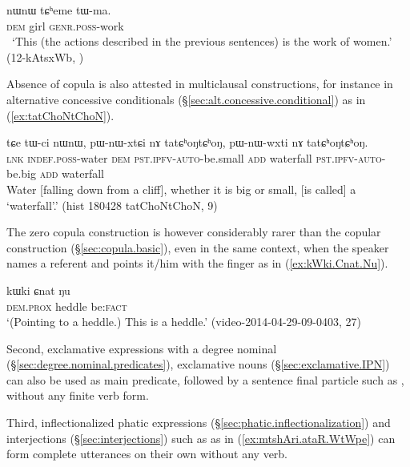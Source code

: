 \begin{exe}
\ex \label{ex:tCheme.tWma}
\gll nɯnɯ tɕʰeme tɯ-ma. \\
\textsc{dem} girl \textsc{genr}.\textsc{poss}-work \\
\glt  `This (the actions described in the previous sentences) is the work of women.' (12-kAtsxWb, )
\end{exe}

Absence of copula is also attested in multiclausal constructions, for instance in alternative concessive conditionals (§\ref{sec:alt.concessive.conditional}) as in (\ref{ex:tatChoNtChoN}).

\begin{exe}
	\ex \label{ex:tatChoNtChoN}
	\gll tɕe tɯ-ci nɯnɯ, pɯ-nɯ-xtɕi nɤ tatɕʰoŋtɕʰoŋ, pɯ-nɯ-wxti nɤ tatɕʰoŋtɕʰoŋ. \\
	\textsc{lnk} \textsc{indef}.\textsc{poss}-water \textsc{dem} \textsc{pst}.\textsc{ipfv}-\textsc{auto}-be.small \textsc{add} waterfall \textsc{pst}.\textsc{ipfv}-\textsc{auto}-be.big \textsc{add} waterfall \\
	\glt Water [falling down from a cliff], whether it is big or small, [is called] a `waterfall'.' 	(hist 180428 tatChoNtChoN, 9)
\end{exe}


The zero copula construction is however considerably rarer than the copular construction (§\ref{sec:copula.basic}), even in the same context, when the speaker names a referent and points it/him with the finger as in (\ref{ex:kWki.Cnat.Nu}).

\begin{exe}
\ex \label{ex:kWki.Cnat.Nu}
\gll  kɯki ɕnat ŋu \\
\textsc{dem}.\textsc{prox} heddle be:\textsc{fact} \\
\glt  `(Pointing to a heddle.) This is a heddle.' (video-2014-04-29-09-0403, 27)
\end{exe}

Second, exclamative expressions with a degree nominal (§\ref{sec:degree.nominal.predicates}), exclamative nouns (§\ref{sec:exclamative.IPN}) can also be used as main predicate, followed by a sentence final particle such as , without any finite verb form.

Third, inflectionalized phatic expressions (§\ref{sec:phatic.inflectionalization}) and interjections  (§\ref{sec:interjections}) such as  as in (\ref{ex:mtshAri.ataR.WtWpe}) can form complete utterances on their own without any verb.

